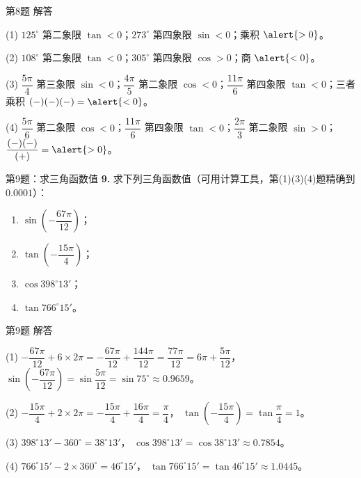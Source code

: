 \documentclass[10pt,aspectratio=169,serif]{beamer}
\begin{document}
\begin{frame}[t]{第8题 解答}
\begin{tcolorbox}[colback=orange!10,colframe=orange,title=\textbf{解}]
\small
(1) $125^\circ$ 第二象限 $\tan<0$；$273^\circ$ 第四象限 $\sin<0$；乘积 $\alert{>0}$。

(2) $108^\circ$ 第二象限 $\tan<0$；$305^\circ$ 第四象限 $\cos>0$；商 $\alert{<0}$。

(3) $\dfrac{5\pi}{4}$ 第三象限 $\sin<0$；$\dfrac{4\pi}{5}$ 第二象限 $\cos<0$；$\dfrac{11\pi}{6}$ 第四象限 $\tan<0$；三者乘积 $(-)(-)(-)=\alert{<0}$。

(4) $\dfrac{5\pi}{6}$ 第二象限 $\cos<0$；$\dfrac{11\pi}{6}$ 第四象限 $\tan<0$；$\dfrac{2\pi}{3}$ 第二象限 $\sin>0$；$\dfrac{(-)(-)}{(+)}=\alert{>0}$。
\end{tcolorbox}
\end{frame}

\begin{frame}[t]{第9题：求三角函数值}
\textbf{9.} 求下列三角函数值（可用计算工具，第(1)(3)(4)题精确到 $0.0001$）：
\begin{enumerate}
  \item $\sin\left(-\dfrac{67\pi}{12}\right)$；
  \item $\tan\left(-\dfrac{15\pi}{4}\right)$；
  \item $\cos 398^\circ 13'$；
  \item $\tan 766^\circ 15'$。
\end{enumerate}
\end{frame}

\begin{frame}[t]{第9题 解答}
\begin{tcolorbox}[colback=orange!10,colframe=orange,title=\textbf{解}]
\small
(1) $-\dfrac{67\pi}{12}+6\times 2\pi=-\dfrac{67\pi}{12}+\dfrac{144\pi}{12}=\dfrac{77\pi}{12}=6\pi+\dfrac{5\pi}{12}$，
$\sin\left(-\dfrac{67\pi}{12}\right)=\sin\dfrac{5\pi}{12}=\sin 75^\circ\approx 0.9659$。

(2) $-\dfrac{15\pi}{4}+2\times 2\pi=-\dfrac{15\pi}{4}+\dfrac{16\pi}{4}=\dfrac{\pi}{4}$，
$\tan\left(-\dfrac{15\pi}{4}\right)=\tan\dfrac{\pi}{4}=1$。

(3) $398^\circ 13'-360^\circ=38^\circ 13'$，
$\cos 398^\circ 13'=\cos 38^\circ 13'\approx 0.7854$。

(4) $766^\circ 15'-2\times 360^\circ=46^\circ 15'$，
$\tan 766^\circ 15'=\tan 46^\circ 15'\approx 1.0445$。
\end{tcolorbox}
\end{frame}
\end{document}
